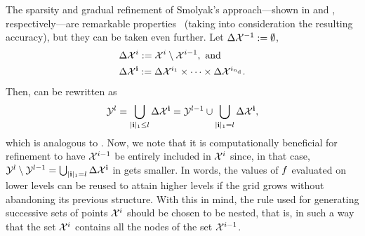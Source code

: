 The sparsity and gradual refinement of Smolyak's approach---shown in
 and , respectively---are
remarkable properties \perse\ (taking into consideration the resulting
accuracy), but they can be taken even further. Let $\Delta\mathcal{X}^{-1} := \emptyset$,
\begin{align*}
  & \Delta\mathcal{X}^i := \mathcal{X}^i \setminus \mathcal{X}^{i - 1}, \text{ and} \\
  & \Delta\mathcal{X}^{\mathbf{i}} := \Delta\mathcal{X}^{i_1} \times \cdots \times \Delta\mathcal{X}^{i_{n_\text{d}}}.
\end{align*}
Then,  can be rewritten as
\begin{equation} \elab{smolyak-grid-incremental}
  \Y^l = \bigcup_{|\vi|_1 \leq l} \Delta\X^\vi = \Y^{l - 1} \cup \bigcup_{|\vi|_1 = l} \Delta\X^\vi,
\end{equation}
which is analogous to . Now, we note that it is
computationally beneficial for refinement to have $\mathcal{X}^{i - 1}$ be entirely
included in $\mathcal{X}^i$ since, in that case, $\mathcal{Y}^l \setminus \mathcal{Y}^{l - 1} =
\bigcup_{|\mathbf{i}|_1 = l} \Delta\mathcal{X}^{\mathbf{i}}$ in  gets
smaller. In words, the values of $f$ evaluated on lower levels can be reused to
attain higher levels if the grid grows without abandoning its previous
structure. With this in mind, the rule used for generating successive sets of
points $\mathcal{X}^i$ should be chosen to be nested, that is, in such a way that the set
$\mathcal{X}^i$ contains all the nodes of the set $\mathcal{X}^{i - 1}$.

